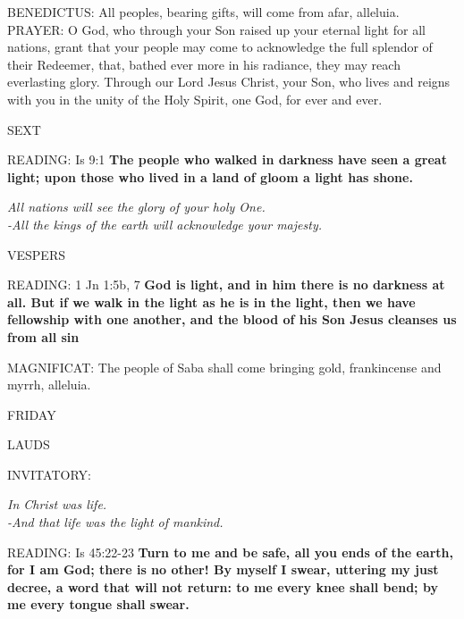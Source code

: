 \noindent\small{\uppercase{BENEDICTUS:}}	All peoples, bearing gifts, will come from afar, alleluia.\\

\noindent\small{\uppercase{PRAYER:}}	O God, who through your Son raised up your eternal light for all nations, grant that your people may come to acknowledge the full splendor of their Redeemer, that, bathed ever more in his radiance, they may reach everlasting glory. Through our Lord Jesus Christ, your Son, who lives and reigns with you in the unity of the Holy Spirit, one God, for ever and ever.

\begin{flushleft}\normalsize{\uppercase{SEXT\\}}\end{flushleft}
\noindent\small{\uppercase{READING:}}   Is 9:1 \textbf{  The people who walked in darkness have seen a great light; upon those who lived in a land of gloom a light has shone.}
\begin{center}\textit{All nations will see the glory of your holy One.\\
-All the kings of the earth will acknowledge your majesty.}\end{center}

\begin{flushleft}\normalsize{\uppercase{VESPERS\\}}\end{flushleft}
\noindent\small{\uppercase{READING:}}   1 Jn 1:5b, 7 \textbf{   God is light, and in him there is no darkness at all. But if we walk in the light as he is in the light, then we have fellowship with one another, and the blood of his Son Jesus cleanses us from all sin\\}

\noindent\small{\uppercase{MAGNIFICAT:}}	The people of Saba shall come bringing gold, frankincense and myrrh, alleluia.\\

\begin{center}
\normalsize FRIDAY
\end{center}

\begin{flushleft}\normalsize{\uppercase{LAUDS\\}}\end{flushleft}
\small{\uppercase{INVITATORY:}}\normalsize
\begin{center}
\textit{In Christ was life.\\}
\textit{-And that life was the light of mankind.\\}
\end{center}
\noindent\small{\uppercase{READING:}}   Is 45:22-23 \textbf{  Turn to me and be safe, all you ends of the earth, for I am God; there is no other! By myself I swear, uttering my just decree, a word that will not return: to me every knee shall bend; by me every tongue shall swear.\\}

